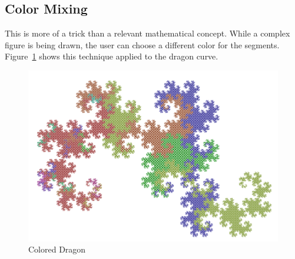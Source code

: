 	\subsection{Color Mixing}

		This is more of a trick than a relevant mathematical concept.
		While a complex figure is being drawn, the user can choose a different color for the segments.
		Figure~\ref{mix_01} shows this technique applied to the dragon curve.

		\begin{figure}[H]
			\centering
			\caption{\label{mix_01} Colored Dragon}
	    	\includegraphics[width=0.8\TW]{img/Advanced_Techniques/Mixing/mix_01.png}
	    \end{figure}